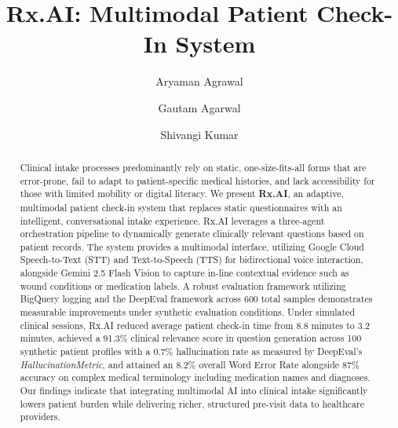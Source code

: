 \documentclass[sigplan,screen]{acmart}
\begin{document}
\title[Rx.AI]{Rx.AI: Multimodal Patient Check-In System}

\author{Aryaman Agrawal}
\affiliation{%
}

\author{Gautam Agarwal}
\affiliation{%
}

\author{Shivangi Kumar}
\affiliation{%
}



\renewcommand{\shortauthors}{Agrawal, Agarwal, and Kumar}

\begin{abstract}
Clinical intake processes predominantly rely on static, one-size-fits-all
forms that are error-prone, fail to adapt to patient-specific medical
histories, and lack accessibility for those with limited mobility or digital
literacy. We present \textbf{Rx.AI}, an adaptive, multimodal patient check-in
system that replaces static questionnaires with an intelligent, conversational
intake experience. Rx.AI leverages a three-agent orchestration pipeline to
dynamically generate clinically relevant questions based on patient records.
The system provides a multimodal interface, utilizing Google Cloud
Speech-to-Text (STT) and Text-to-Speech (TTS) for bidirectional voice
interaction, alongside Gemini 2.5 Flash Vision to capture in-line contextual
evidence such as wound conditions or medication labels. A robust evaluation
framework utilizing BigQuery logging and the DeepEval framework across 600
total samples demonstrates measurable improvements under synthetic evaluation conditions. Under simulated clinical
sessions, Rx.AI reduced average patient check-in time from 8.8 minutes to
3.2 minutes, achieved a 91.3\% clinical relevance score in question generation
across 100 synthetic patient profiles with a 0.7\% hallucination rate as
measured by DeepEval's \textit{HallucinationMetric}, and attained an 8.2\%
overall Word Error Rate alongside 87\% accuracy on complex medical terminology
including medication names and diagnoses. Our findings indicate that
integrating multimodal AI into clinical intake significantly lowers patient
burden while delivering richer, structured pre-visit data to healthcare
providers.
\end{abstract}
\end{document}
